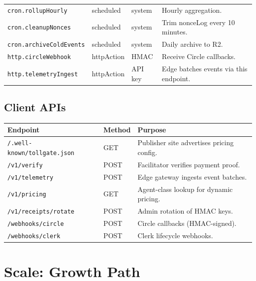 \documentclass[11pt,a4paper]{article}
\begin{document}
\begin{table}[H]
\begin{tabularx}{\textwidth}{@{} l l l X @{}}
\texttt{cron.rollupHourly} & scheduled & system & Hourly aggregation. \\
\texttt{cron.cleanupNonces} & scheduled & system & Trim nonceLog every 10 minutes. \\
\texttt{cron.archiveColdEvents} & scheduled & system & Daily archive to R2. \\
\texttt{http.circleWebhook} & httpAction & HMAC & Receive Circle callbacks. \\
\texttt{http.telemetryIngest} & httpAction & API key & Edge batches events via this endpoint. \\
\bottomrule
\end{tabularx}
\end{table}

\subsection{Client APIs}

\begin{table}[H]
\centering
\footnotesize
\begin{tabularx}{\textwidth}{@{} l l X @{}}
\toprule
\textbf{Endpoint} & \textbf{Method} & \textbf{Purpose} \\
\midrule
\texttt{/.well-known/tollgate.json} & GET & Publisher site advertises pricing config. \\
\texttt{/v1/verify} & POST & Facilitator verifies payment proof. \\
\texttt{/v1/telemetry} & POST & Edge gateway ingests event batches. \\
\texttt{/v1/pricing} & GET & Agent-class lookup for dynamic pricing. \\
\texttt{/v1/receipts/rotate} & POST & Admin rotation of HMAC keys. \\
\texttt{/webhooks/circle} & POST & Circle callbacks (HMAC-signed). \\
\texttt{/webhooks/clerk} & POST & Clerk lifecycle webhooks. \\
\bottomrule
\end{tabularx}
\end{table}

\newpage

\section{Scale: Growth Path}
\end{document}
